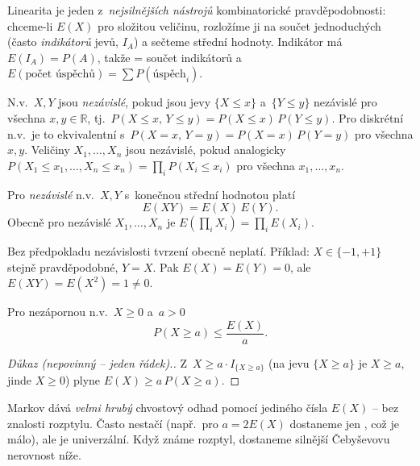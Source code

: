 \documentclass[11pt,a4paper]{article}
\newcommand{\R}{\mathbb{R}}
\begin{document}
\begin{intuice}
Linearita je jeden z~\emph{nejsilnějších nástrojů} kombinatorické pravděpodobnosti: chceme-li $E(X)$ pro složitou veličinu, rozložíme ji na součet jednoduchých (často \emph{indikátorů} jevů, $I_A$) a sečteme střední hodnoty. Indikátor má $E(I_A)=P(A)$, takže  = součet indikátorů a~$E(\text{počet úspěchů})=\sum P(\text{úspěch}_i)$.
\end{intuice}

\begin{definice}
N.v.\ $X,Y$ jsou \emph{nezávislé}, pokud jsou jevy $\{X\le x\}$ a~$\{Y\le y\}$ nezávislé pro všechna $x,y\in\R$, tj.\ $P(X\le x,\,Y\le y)=P(X\le x)\,P(Y\le y)$. Pro diskrétní n.v.\ je to ekvivalentní s~$P(X=x,\,Y=y)=P(X=x)\,P(Y=y)$ pro všechna $x,y$. Veličiny $X_1,\dots,X_n$ jsou nezávislé, pokud analogicky $P(X_1\le x_1,\dots,X_n\le x_n)=\prod_i P(X_i\le x_i)$ pro všechna $x_1,\dots,x_n$.
\end{definice}

\begin{veta}
Pro \emph{nezávislé} n.v.\ $X,Y$ s~konečnou střední hodnotou platí
\[
E(XY)=E(X)\,E(Y).
\]
Obecně pro nezávislé $X_1,\dots,X_n$ je $E(\prod_i X_i)=\prod_i E(X_i)$.
\end{veta}

\begin{poznamka}
Bez předpokladu nezávislosti tvrzení obecně neplatí. Příklad: $X\in\{-1,+1\}$ stejně pravděpodobné, $Y=X$. Pak $E(X)=E(Y)=0$, ale $E(XY)=E(X^2)=1\ne 0$.
\end{poznamka}

\begin{veta}
Pro nezápornou n.v.\ $X\ge 0$ a~$a>0$
\[
P(X\ge a)\le \frac{E(X)}{a}.
\]
\end{veta}

\begin{proof}[Důkaz \textnormal{(nepovinný -- jeden řádek).}]
Z~$X\ge a\cdot I_{\{X\ge a\}}$ (na jevu $\{X\ge a\}$ je $X\ge a$, jinde $X\ge 0$) plyne $E(X)\ge a\,P(X\ge a)$.
\end{proof}

\begin{intuice}
Markov dává \emph{velmi hrubý} chvostový odhad pomocí jediného čísla $E(X)$ -- bez znalosti rozptylu. Často nestačí (např.\ pro $a=2E(X)$ dostaneme jen , což je málo), ale je univerzální. Když známe rozptyl, dostaneme silnější Čebyševovu nerovnost níže.
\end{intuice}
\end{document}
